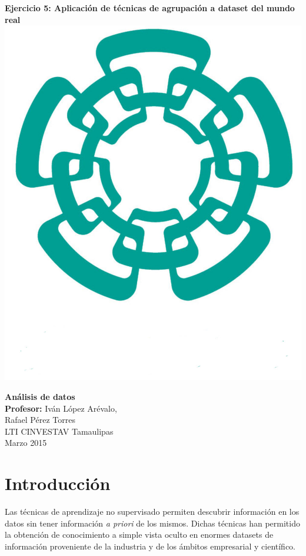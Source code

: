 \documentclass[12pt]{article}
\numberwithin{equation}{section}
\numberwithin{table}{section}
\numberwithin{figure}{section}
\begin{document}
\begin{center}
\textbf{\Large Ejercicio 5: Aplicación de técnicas de agrupación a dataset del mundo real} \\[16pt]

\includegraphics[scale=0.08]{imagenes/cinvestav2}

\textbf{Análisis de datos}\\[10pt]

\textbf{Profesor:} Iván López Arévalo,\\[16pt]
Rafael Pérez Torres\\[16pt]

LTI CINVESTAV Tamaulipas \\[16pt]

Marzo 2015\\[16pt]

\end{center}

\section{Introducción}
Las técnicas de aprendizaje no supervisado permiten descubrir información en los datos sin tener información \emph{a priori} de los mismos.
Dichas técnicas han permitido la obtención de conocimiento a simple vista oculto en enormes datasets de información proveniente de la industria y de los ámbitos empresarial y científico.
\end{document}
